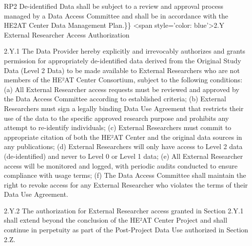 \documentclass[12pt,letterpaper]{article}
\begin{document}
RP2 De-identified Data shall be subject to a review and approval process managed by a Data Access Committee and shall be in accordance with the HE2AT Center Data Management Plan.\}\} <span style='color: blue'>2.Y External Researcher Access Authorization

2.Y.1 The Data Provider hereby explicitly and irrevocably authorizes and grants permission for appropriately de-identified data derived from the Original Study Data (Level 2 Data) to be made available to External Researchers who are not members of the HE²AT Center Consortium, subject to the following conditions: (a) All External Researcher access requests must be reviewed and approved by the Data Access Committee according to established criteria; (b) External Researchers must sign a legally binding Data Use Agreement that restricts their use of the data to the specific approved research purpose and prohibits any attempt to re-identify individuals; (c) External Researchers must commit to appropriate citation of both the HE²AT Center and the original data sources in any publications; (d) External Researchers will only have access to Level 2 data (de-identified) and never to Level 0 or Level 1 data; (e) All External Researcher access will be monitored and logged, with periodic audits conducted to ensure compliance with usage terms; (f) The Data Access Committee shall maintain the right to revoke access for any External Researcher who violates the terms of their Data Use Agreement.

2.Y.2 The authorization for External Researcher access granted in Section 2.Y.1 shall extend beyond the conclusion of the HE²AT Center Project and shall continue in perpetuity as part of the Post-Project Data Use authorized in Section 2.Z.
\end{document}
